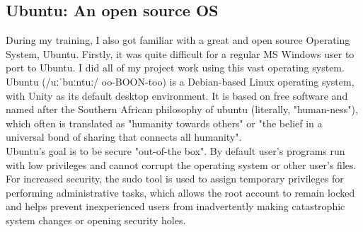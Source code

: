 \subsection{Ubuntu: An open source OS}
During my training, I also got familiar with a great and open source Operating System, Ubuntu. Firstly, it was quite difficult for a regular MS Windows user to port to Ubuntu. I did all of my project work using this vast operating system. 
Ubuntu (/uːˈbuːntuː/ oo-BOON-too) is a Debian-based Linux operating system, with Unity as its default desktop environment. It is based on free software and named after the Southern African philosophy of ubuntu (literally, "human-ness"), which often is translated as "humanity towards others" or "the belief in a universal bond of sharing that connects all humanity".\\
Ubuntu's goal is to be secure "out-of-the box". By default user's programs run with low privileges and cannot corrupt the operating system or other user's files. For increased security, the sudo tool is used to assign temporary privileges for performing administrative tasks, which allows the root account to remain locked and helps prevent inexperienced users from inadvertently making catastrophic system changes or opening security holes.\\
